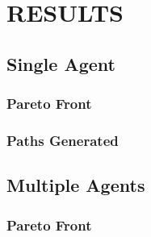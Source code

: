 \documentclass[letterpaper, 10 pt, conference]{ieeeconf}  %
\begin{document}

\section{RESULTS}\label{results}
\subsection{Single Agent}
\subsubsection{Pareto Front}
\subsubsection{Paths Generated}
\subsection{Multiple Agents}
\subsubsection{Pareto Front}
\end{document}
